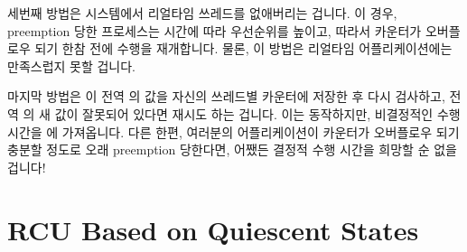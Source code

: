 {{	\fi

	세번째 방법은 시스템에서 리얼타임 쓰레드를 없애버리는 겁니다.
	이 경우, preemption 당한 프로세스는 시간에 따라 우선순위를 높이고,
	따라서 카운터가 오버플로우 되기 한참 전에 수행을 재개합니다.
	물론, 이 방법은 리얼타임 어플리케이션에는 만족스럽지 못할 겁니다.

	마지막 방법은  이 전역  의 값을
	자신의 쓰레드별  카운터에 저장한 후 다시 검사하고,
	전역  의 새 값이 잘못되어 있다면 재시도 하는 겁니다.
	이는 동작하지만, 비결정적인 수행 시간을  에
	가져옵니다.
	다른 한편, 여러분의 어플리케이션이 카운터가 오버플로우 되기 충분할
	정도로 오래 preemption 당한다면, 어쨌든 결정적 수행 시간을 희망할 순
	없을 겁니다!

	\iffalse

	A third approach is to administratively abolish real-time threads
	from the system in question.
	In this case, the preempted process will age up in priority,
	thus getting to run long before the counter had a chance to
	overflow.
	Of course, this approach is less than helpful for real-time
	applications.

	A final approach would be for \co{rcu_read_lock()} to recheck
	the value of the global \co{rcu_gp_ctr} after storing to its
	per-thread \co{rcu_reader_gp} counter, retrying if the new
	value of the global \co{rcu_gp_ctr} is inappropriate.
	This works, but introduces non-deterministic execution time
	into \co{rcu_read_lock()}.
	On the other hand, if your application is being preempted long
	enough for the counter to overflow, you have no hope of
	deterministic execution time in any case!

	\fi

}\QuickQuizEndE
}

\section{RCU Based on Quiescent States}
\label{sec:app:toyrcu:RCU Based on Quiescent States}

